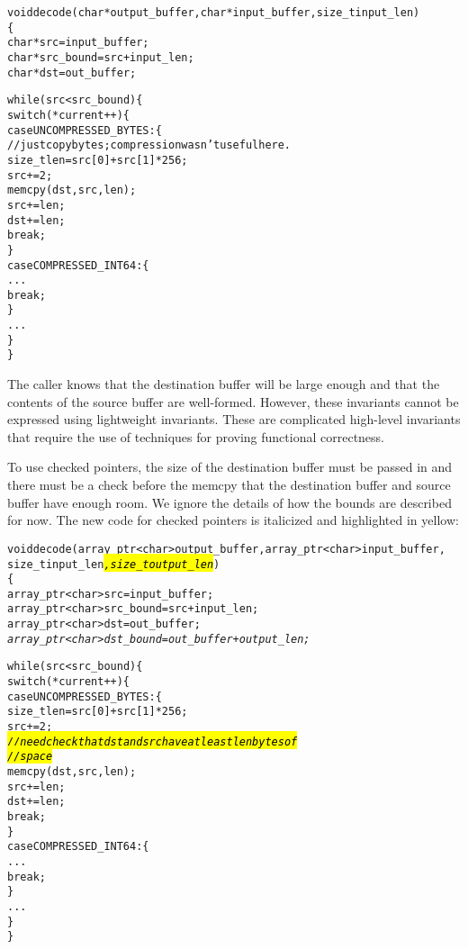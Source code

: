 \begin{alltt}
void decode(char *output\_buffer, char *input\_buffer, size\_t input\_len)
\{
    char *src = input\_buffer;
    char *src\_bound = src + input\_len;
    char *dst = out\_buffer;

    while (src < src\_bound) \{
        switch (*current++) \{
            case UNCOMPRESSED\_BYTES: \{ 
                // just copy bytes; compression wasn't useful here.
                size_t len = src[0] + src[1]*256;
                src += 2;
                memcpy(dst, src, len);
                src += len;
                dst += len;
                break;
            \}
            case COMPRESSED\_INT64: \{
                ...
                break;
            \}
        ...
    \}
\}
\end{alltt}

The caller knows that the destination buffer will be large enough and
that the contents of the source buffer are well-formed. However, these
invariants cannot be expressed using lightweight invariants. These are
complicated high-level invariants that require the use of techniques for
proving functional correctness.

To use checked pointers, the size of the destination buffer must be passed
in and there must be a check before the memcpy that the destination
buffer and source buffer have enough room. We ignore the details of how
the bounds are described for now.    The new code for checked pointers is italicized
and highlighted in yellow:

\begin{alltt}
void decode(array\_ptr<char> output\_buffer, array\_ptr<char> input\_buffer, 
            size\_t input_len\hl{\textit{, size\_t output_len}})
\{
    array\_ptr<char> src = input\_buffer;
    array\_ptr<char> src\_bound = src + input\_len;
    array\_ptr<char> dst = out\_buffer;
    \textit{array\_ptr<char> dst\_bound = out\_buffer + output\_len;}


    while (src < src\_bound) \{
        switch (*current++) \{
            case UNCOMPRESSED\_BYTES: \{ 
                size\_t len = src[0] + src[1]*256;
                src += 2;
                \hl{\textit{// need check that dst and src have at least len bytes of}}
                \hl{\textit{// space}}
                memcpy(dst, src, len);
                src += len;
                dst += len;                
                break;
            \}
            case COMPRESSED\_INT64: \{
                ...
                break;
            \}
        ...
    \}
\}
\end{alltt}

